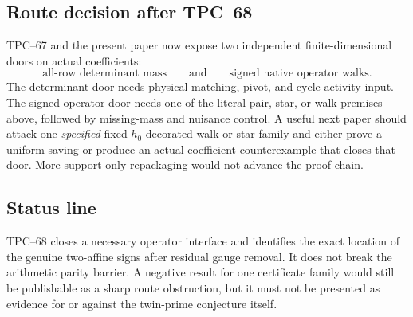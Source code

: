 \subsection{Route decision after TPC--68}

TPC--67 and the present paper now expose two independent finite-dimensional
doors on actual coefficients:
\[
 \text{all-row determinant mass}
 \qquad\text{and}\qquad
 \text{signed native operator walks}.
\]
The determinant door needs physical matching, pivot, and cycle-activity
input.  The signed-operator door needs one of the literal pair, star, or
walk premises above, followed by missing-mass and nuisance control.  A
useful next paper should attack one \emph{specified} fixed-\(h_0\) decorated
walk or star family and either prove a uniform saving or produce an actual
coefficient counterexample that closes that door.  More support-only
repackaging would not advance the proof chain.

\subsection{Status line}

TPC--68 closes a necessary operator interface and identifies the exact
location of the genuine two-affine signs after residual gauge removal.  It
does not break the arithmetic parity barrier.  A negative result for one
certificate family would still be publishable as a sharp route
obstruction, but it must not be presented as evidence for or against the
twin-prime conjecture itself.
